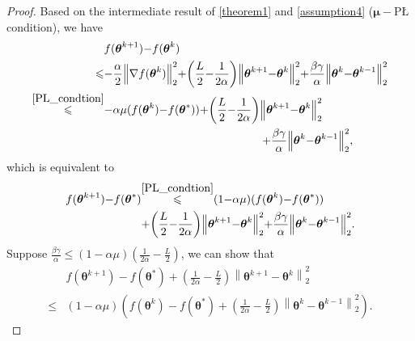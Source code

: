 \documentclass[lettersize,journal]{IEEEtran}
\begin{document}
\begin{proof}
Based on the intermediate result of \cref{theorem1} and \cref{assumption4} ($\mathbf{\mu-}$PŁ condition), we have
\begin{equation}
\thinmuskip=0mu
\medmuskip=0mu
\thickmuskip=0mu
\begin{aligned}
& f(\boldsymbol{\theta}^{k+1})-f(\boldsymbol{\theta}^k) \\
\leqslant & -\frac{\alpha}{2}\left\|\nabla f(\boldsymbol{\theta}^k)\right\|_2^2 + \left( \frac{L}{2} - \frac{1}{2\alpha} \right) \left\|\boldsymbol{\theta}^{k+1} - \boldsymbol{\theta}^{k}\right\|_2^2 + \frac{\beta\gamma}{\alpha} \left\|\boldsymbol{\theta}^{k} - \boldsymbol{\theta}^{k-1}\right\|_2^2 \\
\overset{\eqref{PL_condtion}}{\leqslant}&  -\alpha\mu (f(\boldsymbol{\theta}^k) - f(\boldsymbol{\theta}^*)) + \left( \frac{L}{2} - \frac{1}{2\alpha} \right) \left\|\boldsymbol{\theta}^{k+1} - \boldsymbol{\theta}^{k}\right\|_2^2 \\
&\qquad \qquad \qquad \qquad \qquad \qquad \qquad  + \frac{\beta\gamma}{\alpha} \left\|\boldsymbol{\theta}^{k} - \boldsymbol{\theta}^{k-1}\right\|_2^2,
\end{aligned}
\end{equation}
which is equivalent to 
\begin{equation}
\thinmuskip=0mu
\medmuskip=0mu
\thickmuskip=0mu
\begin{aligned}
f(\boldsymbol{\theta}^{k+1})-f(\boldsymbol{\theta}^*) 
& \overset{\eqref{PL_condtion}}{\leqslant} (1-\alpha\mu) (f(\boldsymbol{\theta}^k) - f(\boldsymbol{\theta}^*)) \\
&+ \left( \frac{L}{2} - \frac{1}{2\alpha} \right) \left\|\boldsymbol{\theta}^{k+1} - \boldsymbol{\theta}^{k}\right\|_2^2 + \frac{\beta\gamma}{\alpha} \left\|\boldsymbol{\theta}^{k} - \boldsymbol{\theta}^{k-1}\right\|_2^2.
\end{aligned}
\end{equation}
Suppose $\frac{\beta\gamma}{\alpha} \leqslant (1-\alpha\mu)\left(\frac{1}{2\alpha} - \frac{L}{2}\right)$, we can show that
\begin{equation}
\begin{aligned}
&f(\boldsymbol{\theta}^{k+1})-f(\boldsymbol{\theta}^*) + \left(\frac{1}{2\alpha} - \frac{L}{2}\right) \left\|\boldsymbol{\theta}^{k+1} - \boldsymbol{\theta}^{k}\right\|_2^2 \\
\leqslant& (1 -\alpha\mu) \left(f(\boldsymbol{\theta}^k) - f(\boldsymbol{\theta}^*) + \left(\frac{1}{2\alpha} - \frac{L}{2}\right) \left\|\boldsymbol{\theta}^{k} - \boldsymbol{\theta}^{k-1}\right\|_2^2\right).

\end{aligned}
\end{equation}
\end{proof}
\end{document}
